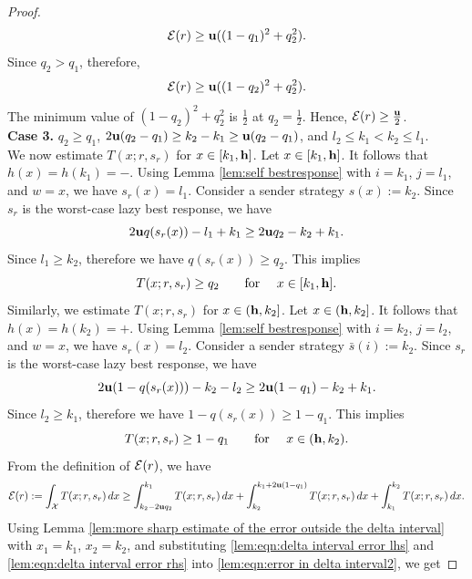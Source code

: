 \begin{proof}
        \[
        \mathcal{E}(r) \geq \mathbf{u}((1 - q_1)^2 + q_2^2).
        \]
        Since $q_2 > q_1$, therefore,
        \[
        \mathcal{E}(r) \geq \mathbf{u}((1 - q_2)^2 + q_2^2).
        \]
        The minimum value of $(1 - q_2)^2 + q_2^2$ is $\frac{1}{2}$ at $q_2 = \frac{1}{2}$. Hence, $\mathcal{E}(r) \geq \frac{\mathbf{u}}{2}$.\\
   \textbf{Case 3. }{$q_2 \geq q_1$, $2\mathbf{u} (q_2 - q_1) \geq k_2 - k_1 \geq \mathbf{u}(q_2 - q_1)$, and $l_2 \leq k_1 < k_2 \leq l_1$.} \\
    We now estimate $T(x;r,s_r)$ for $x \in [k_1,\mathbf{h}]$. Let $x \in [k_1, \mathbf{h}]$. It follows that $h(x) = h(k_1) = \minus$. Using Lemma \ref{lem:self bestresponse} with $i = k_1$, $j = l_1$, and $w = x$, we have $s_r(x) = l_1$.
        Consider a sender strategy $s(x) := k_2$. Since $s_r$ is the worst-case lazy best response, we have
        \[
        2\mathbf{u} q(s_r(x)) - l_1 + k_1 \geq 2\mathbf{u} q_2 - k_2 + k_1.
        \]
        Since $l_1 \geq k_2$, therefore we have $q(s_r(x)) \geq q_2$. This implies
        \begin{equation}\label{lem:eqn:delta interval error lhs}
            T(x; r, s_r) \geq q_2 \quad \hbox{\quad for \quad} x \in [k_1, \mathbf{h}].
        \end{equation}
        Similarly, we estimate $T(x;r,s_r)$ for $x \in (\mathbf{h},k_2]$. Let $x \in (\mathbf{h}, k_2]$. It follows that $h(x) = h(k_2) = \plus$. Using Lemma \ref{lem:self bestresponse} with $i = k_2$, $j = l_2$, and $w = x$, we have $s_r(x) = l_2$.
        Consider a sender strategy $\bar{s}(i) := k_2$. Since $s_r$ is the worst-case lazy best response, we have
        \[
        2\mathbf{u} (1 - q(s_r(x))) - k_2 - l_2 \geq 2\mathbf{u} (1 - q_1) - k_2 + k_1.
        \]
        Since $l_2 \geq k_1$, therefore we have $1 - q(s_r(x)) \geq 1 - q_1$. This implies
        \begin{equation}\label{lem:eqn:delta interval error rhs}
            T(x; r, s_r) \geq 1 - q_1 \quad \hbox{\quad for \quad} x \in (\mathbf{h}, k_2).
        \end{equation}
        From the definition of $\mathcal{E}(r)$, we have
        \begin{equation}\label{lem:eqn:error in delta interval2}
            \mathcal{E}(r) := \int_{\mathcal{X}} T(x; r, s_r) \, dx \geq \int_{k_2 - 2\mathbf{u} q_2}^{k_1} T(x; r, s_r) \, dx + \int_{k_2}^{k_1 + 2\mathbf{u} (1 - q_1)} T(x; r, s_r) \, dx + \int_{k_1}^{k_2} T(x; r, s_r) \, dx.
        \end{equation}
        Using Lemma \ref{lem:more sharp estimate of the error outside the delta interval} with $x_1 = k_1$, $x_2 = k_2$, and substituting \eqref{lem:eqn:delta interval error lhs} and \eqref{lem:eqn:delta interval error rhs} into \eqref{lem:eqn:error in delta interval2}, we get

\end{proof}
